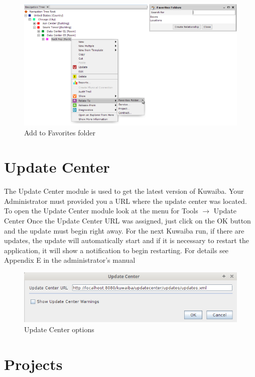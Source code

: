 \documentclass[a4paper]{article}
\begin{document}
			\begin{figure}[h!]
				\centering
				\includegraphics[width=0.9\linewidth]{img/favorites_add_to.png}
				\caption{Add to Favorites folder}
				\label{fig:favorites_add_to}
			\end{figure}
							
		\clearpage
		\section{Update Center}\label{sec:update_center}
		The Update Center module is used to get the latest version of Kuwaiba. Your Administrator must provided you a URL where the update center was located. To open the Update Center module look at the menu for Tools $\rightarrow$ Update Center
		\newline
		Once the Update Center URL was assigned, just click on the OK button and the update must begin right away. For the next Kuwaiba run, if there are updates, the update will automatically start and if it is necessary to restart the application, it will show a notification to begin restarting.
		\newline
		For details see Appendix E in the administrator's manual
		
		\begin{figure}[h!]
			\centering
			\includegraphics[width=0.7\linewidth]{img/update_center.png}
			\caption{Update Center options}
			\label{fig:update_center_options}
		\end{figure}		
		
		\clearpage		
		\section{Projects}\label{sec:projects}
		
\end{document}
